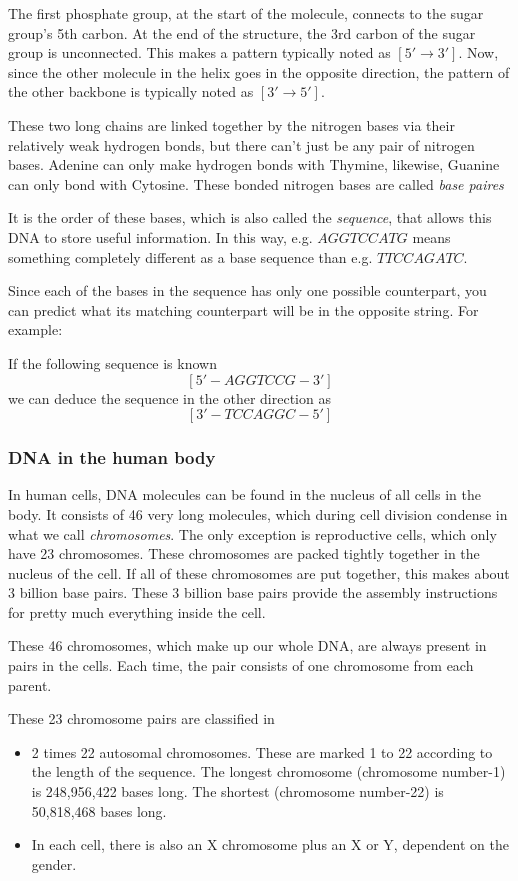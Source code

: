 The first phosphate group, at the start of the molecule, connects to the sugar group's 5th carbon. At the end of the structure, the 3rd carbon of the sugar group is unconnected. This makes a pattern typically noted as $[5' \rightarrow 3']$. Now, since the other molecule in the helix goes in the opposite direction, the pattern of the other backbone is typically noted as $[3' \rightarrow 5']$.

These two long chains are linked together by the nitrogen bases via their relatively weak hydrogen bonds, but there can't just be any pair of nitrogen bases. Adenine can only make hydrogen bonds with Thymine, likewise, Guanine can only bond with Cytosine. These bonded nitrogen bases are called \emph{base paires}

It is the order of these bases, which is also called the \emph{sequence}, that allows this DNA to store useful information. In this way, e.g. $AGGTCCATG$ means something completely different as a base sequence than e.g. $TTCCAGATC$.

Since each of the bases in the sequence has only one possible counterpart, you can predict what its matching counterpart will be in the opposite string. For example:

If the following sequence is known
$$[5' - AGGTCCG - 3']$$
we can deduce the sequence in the other direction as
$$[3' - TCCAGGC - 5']$$

\subsubsection{DNA in the human body}

In human cells, DNA molecules can be found in the nucleus of all cells in the body. It consists of 46 very long molecules, which during cell division condense in what we call \emph{chromosomes}. The only exception is reproductive cells, which only have 23 chromosomes. These chromosomes are packed tightly together in the nucleus of the cell. If all of these chromosomes are put together, this makes about 3 billion base pairs. These 3 billion base pairs provide the assembly instructions for pretty much everything inside the cell.

These 46 chromosomes, which make up our whole DNA, are always present in pairs in the cells. Each time, the pair consists of one chromosome from each parent. 

These 23 chromosome pairs are classified in 
\begin{itemize}
	\item 2 times 22 autosomal chromosomes. These are marked 1 to 22 according to the length of the sequence. The longest chromosome (chromosome number-1) is 248,956,422 bases long. The shortest (chromosome number-22) is 50,818,468 bases long.
	\item In each cell, there is also an X chromosome plus an X or Y, dependent on the gender.
\end{itemize}


